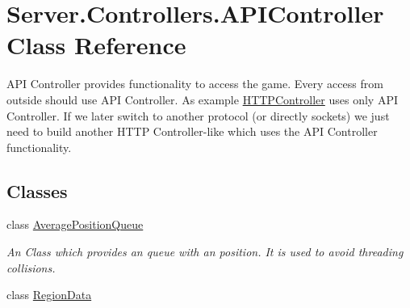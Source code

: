 \hypertarget{classServer_1_1Controllers_1_1APIController}{\section{Server.\-Controllers.\-A\-P\-I\-Controller Class Reference}
\label{classServer_1_1Controllers_1_1APIController}
}


A\-P\-I Controller provides functionality to access the game. Every access from outside should use A\-P\-I Controller. As example \hyperlink{classServer_1_1Controllers_1_1HTTPController}{H\-T\-T\-P\-Controller} uses only A\-P\-I Controller. If we later switch to another protocol (or directly sockets) we just need to build another H\-T\-T\-P Controller-\/like which uses the A\-P\-I Controller functionality.  


\subsection*{Classes}
\begin{DoxyCompactItemize}
\item 
class \hyperlink{classServer_1_1Controllers_1_1APIController_1_1AveragePositionQueue}{Average\-Position\-Queue}
\begin{DoxyCompactList}\small\item\em An Class which provides an queue with an position. It is used to avoid threading collisions. \end{DoxyCompactList}\item 
class \hyperlink{classServer_1_1Controllers_1_1APIController_1_1RegionData}{Region\-Data}
\end{DoxyCompactItemize}
